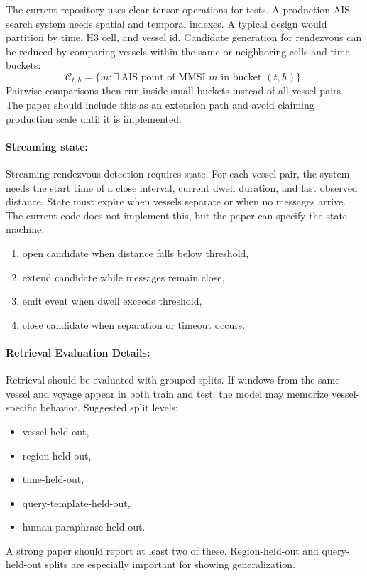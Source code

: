 \documentclass{article}
\begin{document}
The current repository uses clear tensor operations for tests. A production AIS search system needs spatial and temporal indexes. A typical design would partition by time, H3 cell, and vessel id. Candidate generation for rendezvous can be reduced by comparing vessels within the same or neighboring cells and time buckets:
\begin{equation}
  \mathcal{C}_{t,h}=\{m:\exists\ \text{AIS point of MMSI }m\text{ in bucket }(t,h)\}.
\end{equation}
Pairwise comparisons then run inside small buckets instead of all vessel pairs. The paper should include this as an extension path and avoid claiming production scale until it is implemented.

\paragraph{Streaming state:}

Streaming rendezvous detection requires state. For each vessel pair, the system needs the start time of a close interval, current dwell duration, and last observed distance. State must expire when vessels separate or when no messages arrive. The current code does not implement this, but the paper can specify the state machine:
\begin{enumerate}
  \item open candidate when distance falls below threshold,
  \item extend candidate while messages remain close,
  \item emit event when dwell exceeds threshold,
  \item close candidate when separation or timeout occurs.
\end{enumerate}

\paragraph{Retrieval Evaluation Details:}

Retrieval should be evaluated with grouped splits. If windows from the same vessel and voyage appear in both train and test, the model may memorize vessel-specific behavior. Suggested split levels:
\begin{itemize}
  \item vessel-held-out,
  \item region-held-out,
  \item time-held-out,
  \item query-template-held-out,
  \item human-paraphrase-held-out.
\end{itemize}
A strong paper should report at least two of these. Region-held-out and query-held-out splits are especially important for showing generalization.
\end{document}
